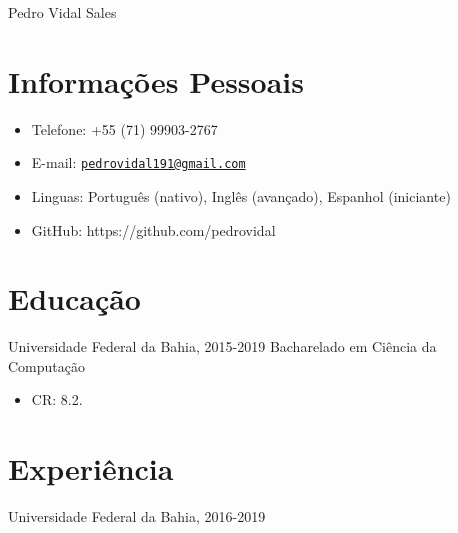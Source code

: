 \documentclass[letterpaper]{article}
\def\name{Pedro Vidal Sales}
\begin{document}
{\huge \name}


\vspace{0.25in}

    

\section*{Informações Pessoais}
    \begin{itemize}
        \item Telefone: +55 (71) 99903-2767
        \item E-mail: \href{mailto:pedrovidal191@gmail.com}{\tt pedrovidal191@gmail.com}
        \item Linguas: Português (nativo), Inglês (avançado), Espanhol (iniciante)
        \item GitHub: https://github.com/pedrovidal
    \end{itemize}

\section*{Educação}

  Universidade Federal da Bahia, 2015-2019
  Bacharelado em Ciência da Computação

  \begin{itemize}
    \item CR: 8.2.
  \end{itemize}

\section*{Experiência}
  Universidade Federal da Bahia, 2016-2019
  
\end{document}
